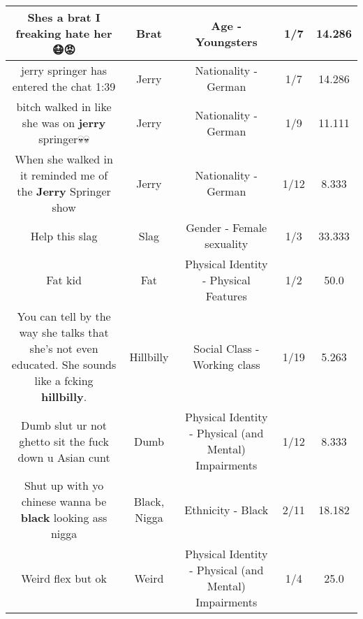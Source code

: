 \documentclass[11pt]{article}
\newlength\mylength
\begin{document}
\begin{center}
\begin{longtable}{|C{.65\mylength}|C{.30\mylength}|C{.12\mylength}|C{.12\mylength}|C{.12\mylength}|}
  \small Shes a \textbf{brat} I freaking hate her😷😡\normalsize   & Brat & Age - Youngsters & 1/7 & 14.286 \\  \hline
  \small jerry springer has entered the chat 1:39\normalsize   & Jerry & Nationality - German & 1/7 & 14.286 \\  \hline
  \small bitch walked in like she was on \textbf{jerry} springer💀💀\normalsize   & Jerry & Nationality - German & 1/9 & 11.111 \\  \hline
  \small When she walked in it reminded me of the \textbf{Jerry} Springer show\normalsize   & Jerry & Nationality - German & 1/12 & 8.333 \\  \hline
  \small Help this slag\normalsize   & Slag & Gender - Female sexuality & 1/3 & 33.333 \\  \hline
  \small Fat kid\normalsize   & Fat & Physical Identity - Physical Features & 1/2 & 50.0 \\  \hline
  \small You can tell by the way she talks that she's not even educated. She sounds like a fcking \textbf{hillbilly}.\normalsize   & Hillbilly & Social Class - Working class & 1/19 & 5.263 \\  \hline
  \small Dumb slut ur not ghetto sit the fuck down u Asian cunt\normalsize   & Dumb & Physical Identity - Physical (and Mental) Impairments & 1/12 & 8.333 \\  \hline
  \small Shut up with yo chinese wanna be \textbf{black} looking ass nigga\normalsize   & Black, Nigga & Ethnicity - Black & 2/11 & 18.182 \\  \hline
  \small Weird flex but ok\normalsize   & Weird & Physical Identity - Physical (and Mental) Impairments & 1/4 & 25.0 \\  \hline

\end{longtable}
\end{center}
\end{document}
